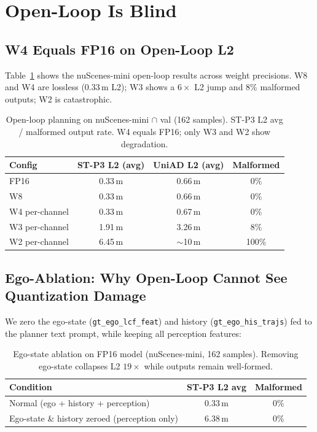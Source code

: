 \documentclass[conference]{IEEEtran}
\begin{document}
\section{Open-Loop Is Blind}
\label{sec:openloop}

\subsection{W4 Equals FP16 on Open-Loop L2}

Table~\ref{tab:openloop} shows the nuScenes-mini open-loop results across weight precisions.
W8 and W4 are lossless (0.33\,m L2); W3 shows a $6\times$ L2 jump and 8\% malformed outputs;
W2 is catastrophic.

\begin{table}[t]\centering
\caption{Open-loop planning on nuScenes-mini $\cap$ val (162 samples). ST-P3 L2 avg / malformed
output rate. W4 equals FP16; only W3 and W2 show degradation.}
\label{tab:openloop}
\begin{tabular}{lccc}
\toprule
Config & ST-P3 L2 (avg) & UniAD L2 (avg) & Malformed \\
\midrule
FP16 & 0.33\,m & 0.66\,m & 0\% \\
W8 & 0.33\,m & 0.66\,m & 0\% \\
W4 per-channel & 0.33\,m & 0.67\,m & 0\% \\
W3 per-channel & 1.91\,m & 3.26\,m & 8\% \\
W2 per-channel & 6.45\,m & $\sim$10\,m & 100\% \\
\bottomrule
\end{tabular}
\end{table}

\subsection{Ego-Ablation: Why Open-Loop Cannot See Quantization Damage}
\label{sec:ablation}

We zero the ego-state (\texttt{gt\_ego\_lcf\_feat}) and history (\texttt{gt\_ego\_his\_trajs})
fed to the planner text prompt, while keeping all perception features:

\begin{table}[t]\centering
\caption{Ego-state ablation on FP16 model (nuScenes-mini, 162 samples). Removing ego-state
collapses L2 $19\times$ while outputs remain well-formed.}
\label{tab:ego}
\begin{tabular}{lcc}
\toprule
Condition & ST-P3 L2 avg & Malformed \\
\midrule
Normal (ego + history + perception) & 0.33\,m & 0\% \\
Ego-state \& history zeroed (perception only) & 6.38\,m & 0\% \\
\bottomrule
\end{tabular}
\end{table}
\end{document}
